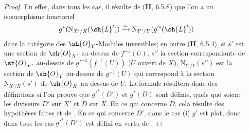 \begin{proof}
En effet, dans tous les cas, il résulte de (\textbf{II}, 6.5.8) que l'on a un isomorphisme fonctoriel
\[
  g^*(\mathrm{N}_{X'/X}(\sh{L}'))\xrightarrow{\sim}\mathrm{N}_{Y'/Y}(g'^*(\sh{L}'))
\]
dans la catégorie des $\sh{O}_Y$-Modules inversibles;
en outre (\textbf{II}, 6.5.4), si $s'$ est une section de $\sh{O}_{X'}$ au-dessus de $f^{-1}(U)$, $s''$ la section correspondante de $\sh{O}_{Y'}$ au-dessus de $g'^{-1}(f^{-1}(U))$ ($U$ ouvert de $X$), $\mathrm{N}_{Y'/Y}(s'')$ est la section de $\sh{O}_Y$ au-dessus de $g^{-1}(U)$ qui correspond à la section $\mathrm{N}_{X'/X}(s')$ de $\sh{O}_X$ au-dessus de $U$.
La formule  résultera donc des définitions si l'on prouve que $g'^*(D')$ et $g^*(D)$ sont définis, quels que soient les diviseurs $D'$ sur $X'$ et $D$ sur $X$.
En ce qui concerne $D$, cela résulte des hypothèses faites et de .
En ce qui concerne $D'$, dans le cas (i) $g'$ est plat, donc dans tous les cas $g'^*(D')$ est défini en vertu de .
\end{proof}

